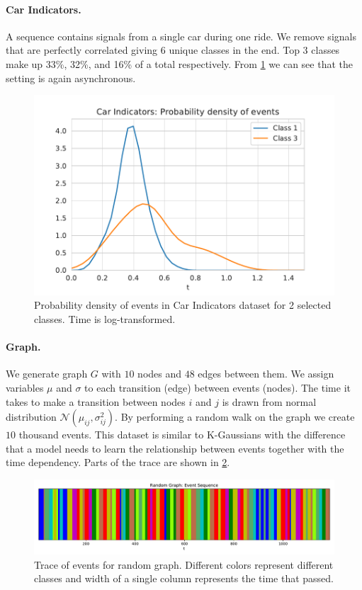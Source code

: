 \paragraph{Car Indicators.}
A sequence contains signals from a single car during one ride. We remove signals that are perfectly correlated giving 6 unique classes in the end. Top 3 classes make up 33\%, 32\%, and 16\% of a total respectively. From \cref{fig:car-indicators-density} we can see that the setting is again asynchronous.
\begin{figure}[H]
    \centering
    \includegraphics[width=0.35 \linewidth]{sections/010_neurips2019/paper/images/car-indicators-density.pdf}
    \caption{Probability density of events in Car Indicators dataset for 2 selected classes. Time is log-transformed.}\label{fig:car-indicators-density}
\end{figure}

\paragraph{Graph.}

We generate graph $G$ with $10$ nodes and $48$ edges between them. We assign variables $\mu$ and $\sigma$ to each transition (edge) between events (nodes). The time it takes to make a transition between nodes $i$ and $j$ is drawn from normal distribution $\mathcal{N}(\mu_{ij}, \sigma^2_{ij})$. By performing a random walk on the graph we create $10$ thousand events. This dataset is similar to K-Gaussians with the difference that a model needs to learn the relationship between events together with the time dependency. Parts of the trace are shown in \cref{fig:random-graph-trace}.
\begin{figure}[H]
    \centering
    \includegraphics[width=\linewidth]{sections/010_neurips2019/paper/images/random-graph-trace.pdf}
    \caption{Trace of events for random graph. Different colors represent different classes and width of a single column represents the time that passed.}\label{fig:random-graph-trace}
\end{figure}
